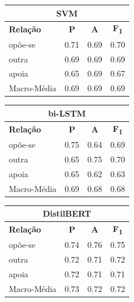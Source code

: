 \documentclass[a4paper, twocolumn, 11pt, twoside]{article}
\begin{document}
\begin{table}[!h]
    \begin{center}
    \begin{tabular}{l ccc}
		\multicolumn{4}{c}{SVM}\\
		\hline
        {\bf Relação} & {\bf P} & {\bf A} & {\bf F\textsubscript{1}} \\
		\hline
        opõe-se          &  0.71  &  0.69  &  0.70   \\
        outra            &  0.69  &  0.69  &  0.69   \\
        apoia            &  0.65  &  0.69  &  0.67   \\
		\hline
		Macro-Média      &	0.69  &  0.69  &  0.69   \\
    \end{tabular}
	\end{center}
\end{table}


\begin{table}[!h]
    \begin{center}
    \begin{tabular}{l ccc}
		\multicolumn{4}{c}{bi-LSTM}\\
		\hline
        {\bf Relação} & {\bf P} & {\bf A} & {\bf F\textsubscript{1}} \\
		\hline
        opõe-se          &  0.75  &  0.64  &  0.69   \\
        outra            &  0.65  &  0.75  &  0.70   \\
        apoia            &  0.65  &  0.62  &  0.63   \\
		\hline
		Macro-Média      &  0.69  &  0.68  &  0.68   \\
    \end{tabular}
	\end{center}
\end{table}


\begin{table}[!h]
    \begin{center}
    \begin{tabular}{l ccc}
		\multicolumn{4}{c}{DistilBERT}\\
		\hline
        {\bf Relação} & {\bf P} & {\bf A} & {\bf F\textsubscript{1}} \\
		\hline
        opõe-se          &  0.74  &  0.76  &  0.75   \\
        outra            &  0.72  &  0.71  &  0.72   \\
        apoia            &  0.72  &  0.71  &  0.71   \\
		\hline
		Macro-Média      &  0.73  &  0.72  &  0.72   \\
    \end{tabular}
	\end{center}
\end{table}
\end{document}
